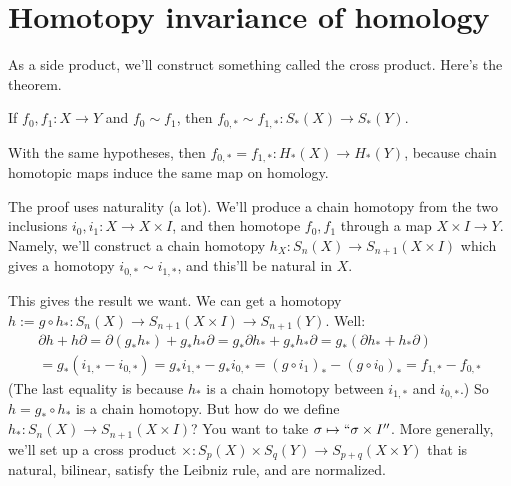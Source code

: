 \section{Homotopy invariance of homology}
As a side product, we'll construct something called the cross product. Here's the theorem.
	\begin{theorem}
	If $f_0,f_1:X\to Y$ and $f_0\sim f_1$, then $f_{0,\ast}\sim f_{1,\ast}:S_\ast(X)\to S_\ast(Y)$.
	\end{theorem}
	\begin{corollary}
	With the same hypotheses, then $f_{0,\ast}=f_{1,\ast}: H_\ast(X)\to H_\ast(Y)$, because chain homotopic maps induce the same map on homology.
	\end{corollary}
The proof uses naturality (a lot). We'll produce a chain homotopy from the two inclusions $i_0,i_1:X\to X\times I$, and then homotope $f_0,f_1$ through a map $X\times I\to Y$. Namely, we'll construct a chain homotopy $h_X:S_n(X)\to S_{n+1}(X\times I)$ which gives a homotopy $i_{0,\ast}\sim i_{1,\ast}$, and this'll be natural in $X$.

This gives the result we want. We can get a homotopy $h:=g\circ h_\ast:S_n(X)\to S_{n+1}(X\times I)\to S_{n+1}(Y)$. Well:
		\begin{multline*}
		\partial h + h\partial = \partial(g_\ast h_\ast) + g_\ast h_\ast\partial=g_\ast\partial h_\ast + g_\ast h_\ast \partial = g_\ast(\partial h_\ast + h_\ast\partial)\\
		 = g_\ast(i_{1,\ast} - i_{0,\ast}) = g_\ast i_{1,\ast} - g_\ast i_{0,\ast} = (g\circ i_1)_\ast - (g\circ i_0)_{\ast} = f_{1,\ast} - f_{0,\ast}
		\end{multline*}
(The last equality is because $h_\ast$ is a chain homotopy between $i_{1,\ast}$ and $i_{0,\ast}$.) So $h=g_\ast\circ h_\ast$ is a chain homotopy. But how do we define $h_\ast:S_n(X)\to S_{n+1}(X\times I)$? You want to take $\sigma\mapsto``\sigma\times I''$. More generally, we'll set up a cross product $\times:S_p(X)\times S_q(Y)\to S_{p+q}(X\times Y)$ that is natural, bilinear, satisfy the Leibniz rule, and are normalized.

